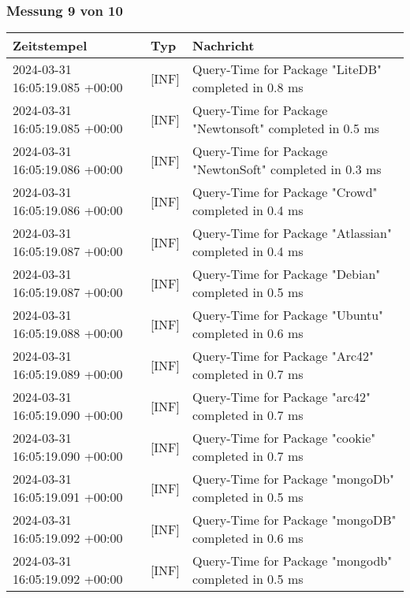     \subsubsection*{Messung 9 von 10} \label{subsubsec:MySQLMitIndex9von10}
        {
            {\small
                \begin{tabularx}{\textwidth}{|l|l|X|}
                    \hline
                    \textbf{Zeitstempel} & \textbf{Typ} & \textbf{Nachricht} \\
                    \hline
                    \endhead
                    2024-03-31 16:05:19.085 +00:00 & [INF] & Query-Time for Package "LiteDB" completed in 0.8 ms \\
                    2024-03-31 16:05:19.085 +00:00 & [INF] & Query-Time for Package "Newtonsoft" completed in 0.5 ms \\
                    2024-03-31 16:05:19.086 +00:00 & [INF] & Query-Time for Package "NewtonSoft" completed in 0.3 ms \\
                    2024-03-31 16:05:19.086 +00:00 & [INF] & Query-Time for Package "Crowd" completed in 0.4 ms \\
                    2024-03-31 16:05:19.087 +00:00 & [INF] & Query-Time for Package "Atlassian" completed in 0.4 ms \\
                    2024-03-31 16:05:19.087 +00:00 & [INF] & Query-Time for Package "Debian" completed in 0.5 ms \\
                    2024-03-31 16:05:19.088 +00:00 & [INF] & Query-Time for Package "Ubuntu" completed in 0.6 ms \\
                    2024-03-31 16:05:19.089 +00:00 & [INF] & Query-Time for Package "Arc42" completed in 0.7 ms \\
                    2024-03-31 16:05:19.090 +00:00 & [INF] & Query-Time for Package "arc42" completed in 0.7 ms \\
                    2024-03-31 16:05:19.090 +00:00 & [INF] & Query-Time for Package "cookie" completed in 0.7 ms \\
                    2024-03-31 16:05:19.091 +00:00 & [INF] & Query-Time for Package "mongoDb" completed in 0.5 ms \\
                    2024-03-31 16:05:19.092 +00:00 & [INF] & Query-Time for Package "mongoDB" completed in 0.6 ms \\
                    2024-03-31 16:05:19.092 +00:00 & [INF] & Query-Time for Package "mongodb" completed in 0.5 ms \\

\end{tabularx}}}
